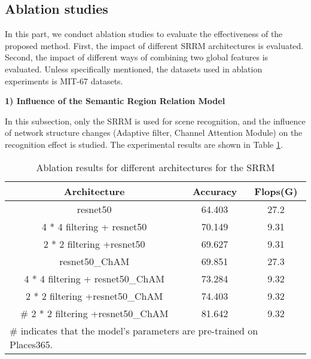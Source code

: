 \documentclass[conference]{IEEEtran}
\begin{document}
\subsection{Ablation studies}

In this part, we conduct ablation studies to evaluate the effectiveness of the proposed method. First, the impact of different SRRM architectures is evaluated. Second, the impact of different ways of combining two global features is evaluated. Unless specifically mentioned, the datasets used in ablation experiments is MIT-67 datasets. 

\textbf{1) Influence of the Semantic Region Relation Model}

In this subsection, only the SRRM is used for scene recognition, and the influence of network structure changes (Adaptive filter, Channel Attention Module) on the recognition effect is studied. The experimental results are shown in Table \ref{tab1}.

\begin{table}[htbp]
    \centering
    \caption{Ablation results for different architectures for the SRRM}
    \begin{tabular}{ccc}
        \hline
        \textbf{Architecture} & \textbf{Accuracy} & \textbf{Flops(G)} \\ \hline
        resnet50 & 64.403 & 27.2  \\ 
        4 * 4 filtering + resnet50 & 70.149 & 9.31  \\ 
        2 * 2 filtering +resnet50 & 69.627 & 9.31  \\ 
        resnet50\_ChAM & 69.851 & 27.3  \\ 
        4 * 4 filtering + resnet50\_ChAM & 73.284 & 9.32  \\ 
        2 * 2 filtering +resnet50\_ChAM & 74.403 & 9.32  \\ 
        \# 2 * 2 filtering +resnet50\_ChAM & 81.642 & 9.32  \\ \hline
        \multicolumn{3}{l}{\# indicates that the model's parameters are pre-trained on Places365.}
    \end{tabular}
    \label{tab1}
\end{table}
\end{document}
